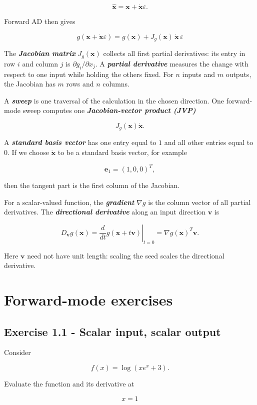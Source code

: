 \documentclass{course_sheet}
\begin{document}
\[
\hat{\mathbf{x}}
=\mathbf{x}+\dot{\mathbf{x}}\varepsilon.
\]

Forward AD then gives

\[
{
 g(\mathbf{x}+\dot{\mathbf{x}}\varepsilon)
 = g(\mathbf{x}) + J_g(\mathbf{x})\,\dot{\mathbf{x}}\,\varepsilon
}
\]

The \textbf{\textit{Jacobian matrix}} $J_g(\mathbf{x})$ collects all first partial derivatives: its entry in row $i$ and column $j$ is $\partial g_i/\partial x_j$. A \textbf{\textit{partial derivative}} measures the change with respect to one input while holding the others fixed. For $n$ inputs and $m$ outputs, the Jacobian has $m$ rows and $n$ columns.

A \textbf{\textit{sweep}} is one traversal of the calculation in the chosen direction. One forward-mode sweep computes one \textbf{\textit{Jacobian-vector product (JVP)}}

\[
J_g(\mathbf{x})\dot{\mathbf{x}}.
\]

A \textbf{\textit{standard basis vector}} has one entry equal to $1$ and all other entries equal to $0$. If we choose $\dot{\mathbf{x}}$ to be a standard basis vector, for example

\[
\mathbf{e}_1=(1,0,0)^T,
\]

then the tangent part is the first column of the Jacobian.

For a scalar-valued function, the \textbf{\textit{gradient}} $\nabla g$ is the column vector of all partial derivatives. The \textbf{\textit{directional derivative}} along an input direction $\mathbf v$ is

\[
D_{\mathbf v}g(\mathbf x)=\left.\frac{d}{dt}g(\mathbf x+t\mathbf v)\right|_{t=0}=\nabla g(\mathbf x)^T\mathbf v.
\]

Here $\mathbf v$ need not have unit length: scaling the seed scales the directional derivative.

\section*{Forward-mode exercises}
\subsection*{Exercise 1.1 - Scalar input, scalar output}
Consider

\[
f(x)=\log\left(xe^x+3\right).
\]

Evaluate the function and its derivative at

\[
x=1
\]
\end{document}

